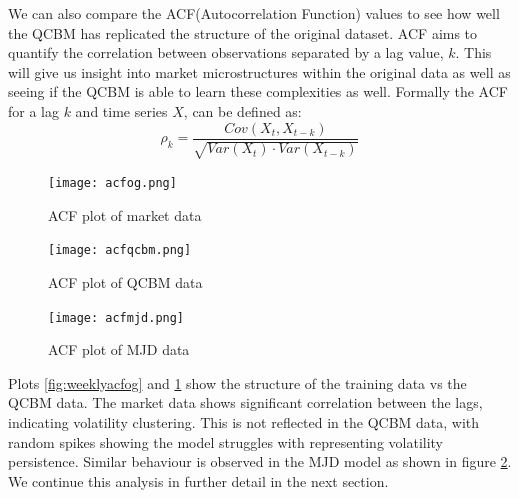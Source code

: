 \documentclass[12pt]{article}
\numberwithin{equation}{section}
\begin{document}
We can also compare the ACF(Autocorrelation Function) values to see how well the 
QCBM has replicated the structure of the original dataset. ACF aims to quantify 
the correlation between observations separated by a lag value, $k$. This will 
give us insight into market microstructures within the original data as well as 
seeing if the QCBM is able to learn these complexities as well. Formally the ACF 
for a lag $k$ and time series $X$, can be defined as:
\begin{equation}
  \rho_k = \frac{Cov(X_t, X_{t-k})}{\sqrt{Var(X_t)\cdot Var(X_{t-k})}}
\end{equation}
\begin{figure}[h!]
    \centering
    \begin{minipage}{0.48\textwidth}
        \centering
        \texttt{[image: acfog.png]}
        \caption{ACF plot of market data}
        \label{fig:weeklyacfog}
    \end{minipage}
    \hfill
    \begin{minipage}{0.48\textwidth}
        \centering
        \texttt{[image: acfqcbm.png]}
        \caption{ACF plot of QCBM data}
        \label{fig:weeklyacfqcbm}
    \end{minipage}
\end{figure}
\begin{figure}[h!]
  \centering
  \texttt{[image: acfmjd.png]}
  \caption{ACF plot of MJD data}
  \label{fig:weeklyacfmjd}
\end{figure}
Plots \ref{fig:weeklyacfog} and \ref{fig:weeklyacfqcbm} show the structure of 
the training data vs the QCBM data. The market data shows significant correlation 
between the lags, indicating volatility clustering. This is not reflected in the 
QCBM data, with random spikes showing the model struggles with representing 
volatility persistence. Similar behaviour is observed in the MJD model as shown in 
figure \ref{fig:weeklyacfmjd}. We continue this analysis in further detail in the next section. 
\newpage
\end{document}
